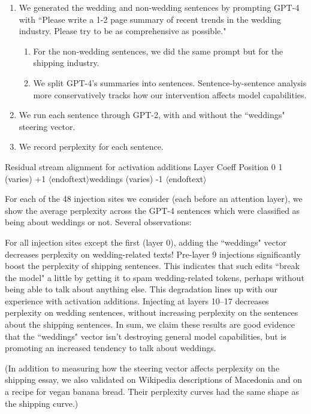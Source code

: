 \documentclass[10pt]{article}
\newcommand{\eot}{$\langle$\textbar endoftext\textbar$\rangle$}
\begin{document}
\begin{enumerate}
\item We generated the wedding and non-wedding sentences by prompting GPT-4 with ``Please write a 1-2 page summary of recent trends in the wedding industry. Please try to be as comprehensive as possible."
\begin{enumerate}
\item For the non-wedding sentences, we did the same prompt but for the shipping industry.
\item We split GPT-4's summaries into sentences. Sentence-by-sentence analysis more conservatively tracks how our intervention affects model capabilities.%
\end{enumerate}
\item We run each sentence through GPT-2, with and without the ``weddings" steering vector.
\item We record perplexity for each sentence.%
\end{enumerate}

Residual stream alignment for activation additions
Layer	Coeff	Position 0	1
(varies)	+1	\eot	 weddings
(varies)	-1	\eot	 

For each of the 48 injection sites we consider (each before an attention layer), we show the average perplexity across the GPT-4 sentences which were classified as being about weddings or not.
Several observations:

For all injection sites except the first (layer 0), adding the ``weddings" vector decreases perplexity on wedding-related texts!
Pre-layer 9 injections significantly boost the perplexity of shipping sentences. This indicates that such edits ``break the model" a little by getting it to spam wedding-related tokens, perhaps without being able to talk about anything else. This degradation lines up with our experience with activation additions.
Injecting at layers 10–17 decreases perplexity on wedding sentences, without increasing perplexity on the sentences about the shipping sentences.
In sum, we claim these results are good evidence that the ``weddings" vector isn't destroying general model capabilities, but is promoting an increased tendency to talk about weddings. 

(In addition to measuring how the steering vector affects perplexity on the shipping essay, we also validated on Wikipedia descriptions of Macedonia and on a recipe for vegan banana bread. Their perplexity curves had the same shape as the shipping curve.)
\end{document}
